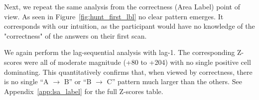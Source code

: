 \documentclass[manuscript,review,anonymous]{acmart}
\begin{document}

        Next, we repeat the same analysis from the correctness (Area Label) point of view. As seen in Figure~\ref{fig:hunt_first_lbl} no clear pattern emerges. It corresponds with our intuition, as the participant would have no knowledge of the "correctness" of the answers on their first scan.

        We again perform the lag-sequential analysis with lag-1. The corresponding Z-scores were all of moderate magnitude (+80 to +204) with no single positive cell dominating. This quantitatively confirms that, when viewed by correctness, there is no single “A $\to$ B” or “B $\to$ C” pattern much larger than the others.  See Appendix~\ref{app:lsa_label} for the full Z-scores table.
        
\end{document}
